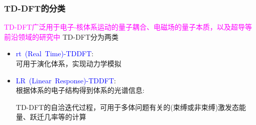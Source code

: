 \frame
{
	\frametitle{\textrm{TD-DFT}的分类}
	\textcolor{magenta}{\textrm{TD-DFT}广泛用于电子-核体系运动的量子耦合、电磁场的量子本质，以及超导等前沿领域的研究中}
	\vskip 5pt
\textrm{TD-DFT}分为两类
\begin{itemize}
	\item \textcolor{blue}{\textrm{rt~(Real~Time)-TDDFT}}:\\
		可用于演化体系，实现动力学模拟\\
{\fontsize{7.2pt}{4.2pt}}
	\item \textcolor{blue}{\textrm{LR~(Linear~Response)-TDDFT}}:\\
		根据体系的电子结构得到体系的光谱信息:\\
		{\fontsize{7.2pt}{4.2pt}\selectfont{不产生体系的动力学演化信息}}
	\begin{itemize}
{\fontsize{7.2pt}{4.2pt}}
	\end{itemize}
	\textrm{TD-DFT}的自洽迭代过程，可用于多体问题有关的(束缚或非束缚)激发态能量、跃迁几率等的计算
\end{itemize}
}

